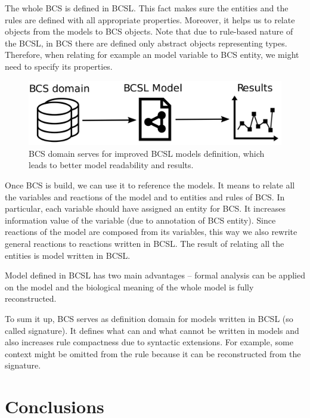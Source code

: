 \documentclass[12pt]{fithesis2}
\begin{document}
The whole BCS is defined in BCSL. This fact makes sure the entities and the rules are defined with all appropriate properties. Moreover, it helps us to relate objects from the models to BCS objects. Note that due to rule-based nature of the BCSL, in BCS there are defined only abstract objects representing types. Therefore, when relating for example an model variable to BCS entity, we might need to specify its properties. 

\begin{figure}[!h]
\begin{center}
  \includegraphics[scale=0.13]{pics/bcsl_vs_bcs.pdf}
\end{center}
\caption{BCS domain serves for improved BCSL models definition, which leads to better model readability and results.}
\end{figure}

Once BCS is build, we can use it to reference the models. It means to relate all the variables and reactions of the model and to entities and rules of BCS. In particular, each variable should have assigned an entity for BCS. It increases information value of the variable (due to annotation of BCS entity). Since reactions of the model are composed from its variables, this way we also rewrite general reactions to reactions written in BCSL. The result of relating all the entities is model written in BCSL. 

Model defined in BCSL has two main advantages -- formal analysis can be applied on the model and the biological meaning of the whole model is fully reconstructed.

To sum it up, BCS serves as definition domain for models written in BCSL (so called signature). It defines what can and what cannot be written in models and also increases rule compactness due to syntactic extensions. For example, some context might be omitted from the rule because it can be reconstructed from the signature.

\chapter{Conclusions}
\end{document}
